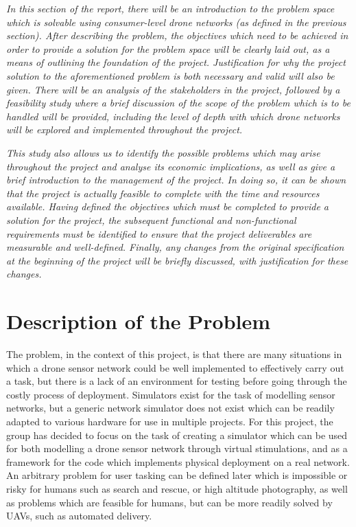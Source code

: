 \emph{In this section of the report, there will be an introduction to the problem space which is solvable using consumer-level drone networks (as defined in the previous section). After describing the problem, the objectives which need to be achieved in order to provide a solution for the problem space will be clearly laid out, as a means of outlining the foundation of the project. Justification for why the project solution to the aforementioned problem is both necessary and valid will also be given. There will be an analysis of the stakeholders in the project, followed by a feasibility study where a brief discussion of the scope of the problem which is to be handled will be provided, including the level of depth with which drone networks will be explored and implemented throughout the project.}

\emph{This study also allows us to identify the possible problems which may arise throughout the project and analyse its economic implications, as well as give a brief introduction to the management of the project. In doing so, it can be shown that the project is actually feasible to complete with the time and resources available. Having defined the objectives which must be completed to provide a solution for the project, the subsequent functional and non-functional requirements must be identified to ensure that the project deliverables are measurable and well-defined. Finally, any changes from the original specification at the beginning of the project will be briefly discussed, with justification for these changes.}

\section{Description of the Problem}
The problem, in the context of this project, is that there are many situations in which a drone sensor network could be well implemented to effectively carry out a task, but there is a lack of an environment for testing before going through the costly process of deployment. Simulators exist for the task of modelling sensor networks, but a generic network simulator does not exist which can be readily adapted to various hardware for use in multiple projects. For this project, the group has decided to focus on the task of creating a simulator which can be used for both modelling a drone sensor network through virtual stimulations, and as a framework for the code which implements physical deployment on a real network. An arbitrary problem for user tasking can be defined later which is impossible or risky for humans such as search and rescue, or high altitude photography, as well as problems which are feasible for humans, but can be more readily solved by UAVs, such as automated delivery. 

